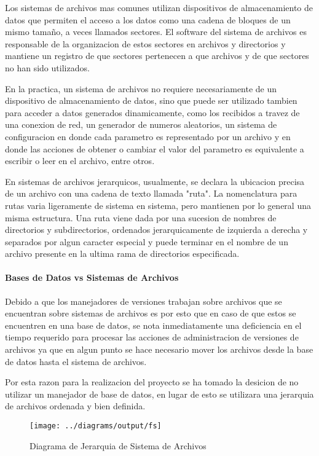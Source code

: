 Los sistemas de archivos mas comunes utilizan dispositivos de almacenamiento de datos que permiten el acceso a los datos como una cadena de bloques de un mismo tamaño, a veces llamados sectores. El software del sistema de archivos es responsable de la organizacion de estos sectores en archivos y directorios y mantiene un registro de que sectores pertenecen a que archivos y de que sectores no han sido utilizados.

En la practica, un sistema de archivos no requiere necesariamente de un dispositivo de almacenamiento de datos, sino que puede ser utilizado tambien para acceder a datos generados dinamicamente, como los recibidos a travez de una conexion de red, un generador de numeros aleatorios, un sistema de configuracion en donde cada parametro es representado por un archivo y en donde las acciones de obtener o cambiar el valor del parametro es equivalente a escribir o leer en el archivo, entre otros.

En sistemas de archivos jerarquicos, usualmente, se declara la ubicacion precisa de un archivo con una cadena de texto llamada "ruta". La nomenclatura para rutas varia ligeramente de sistema en sistema, pero mantienen por lo general una misma estructura. Una ruta viene dada por una sucesion de nombres de directorios y subdirectorios, ordenados jerarquicamente de izquierda a derecha y separados por algun caracter especial y puede terminar en el nombre de un archivo presente en la ultima rama de directorios especificada.


\paragraph{Bases de Datos vs Sistemas de Archivos}

Debido a que los manejadores de versiones trabajan sobre archivos que se encuentran sobre sistemas de archivos es por esto que en caso de que estos se encuentren en una base de datos, se nota inmediatamente una deficiencia en el tiempo requerido para procesar las acciones de administracion de versiones de archivos ya que en algun punto se hace necesario mover los archivos desde la base de datos hasta el sistema de archivos.

Por esta razon para la realizacion del proyecto se ha tomado la desicion de no utilizar un manejador de base de datos, en lugar de esto se utilizara una jerarquia de archivos ordenada y bien definida.


\begin{figure}
 \centering
 \texttt{[image: ../diagrams/output/fs]}
 \caption{Diagrama de Jerarquia de Sistema de Archivos}
 \label{diagrama:fs}
\end{figure}
